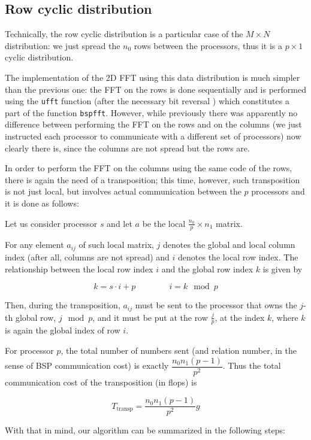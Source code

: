 \documentclass[a4paper,11pt]{article}
\begin{document}
\subsection{Row cyclic distribution}

Technically, the row cyclic distribution is a particular case of the $M\times N$ distribution: we just spread the $n_0$ rows between the processors, thus it is a $p \times 1$ cyclic distribution.

The implementation of the 2D FFT using this data distribution is much simpler than the previous one: the FFT on the rows is done sequentially and is performed using the \verb|ufft| function (after the necessary bit reversal \citep{parsc}) which constitutes a part of the function \verb|bspfft|. However, while previously there was apparently no difference between performing the FFT on the rows and on the columns (we just instructed each processor to communicate with a different set of processors) now clearly there is, since the columns are not spread but the rows are.

In order to perform the FFT on the columns using the same code of the rows, there is again the need of a transposition; this time, however, such transposition is not just local, but involves actual communication between the $p$ processors and it is done as follows:

Let us consider processor $s$ and let $a$ be the local $\frac{n_0}{p} \times n_1$ matrix. 

For any element $a_{ij}$ of such local matrix, $j$ denotes the global and local column index (after all, columns are not spread) and $i$ denotes the local row index. The relationship between the local row index $i$ and the global row index $k$ is given by

$$k = s\cdot i+p\qquad \qquad i = k\mod p$$

Then, during the transposition, $a_{ij}$ must be sent to the processor that owns the $j$-th global row, $j \mod p$, and it must be put at the row $\frac{j}{p}$, at the index $k$, where $k$ is again the global index of row $i$.

For processor $p$, the total number of numbers sent (and relation number, in the sense of BSP communication cost) is exactly $\dfrac{n_0 n_1 (p-1)}{p^2}$. Thus the total communication cost of the transposition (in flops) is

$$T_\text{transp} = \dfrac{n_0 n_1 (p-1)}{p^2}g$$

With that in mind, our algorithm can be summarized in the following steps:
\end{document}
